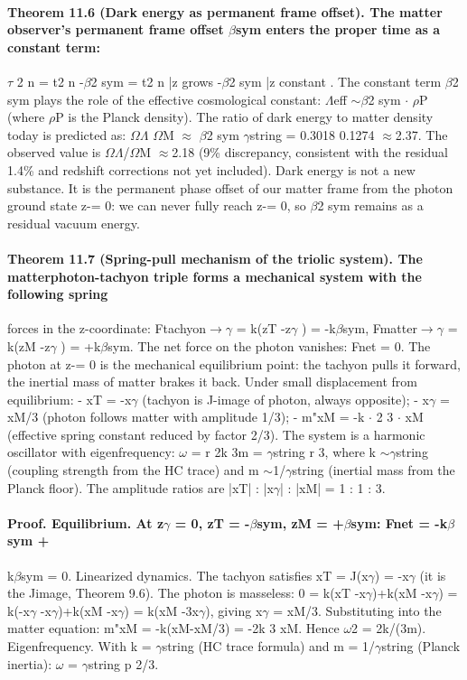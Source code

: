 \documentclass[12pt,a4paper]{article}
\begin{document}
\paragraph*{Theorem 11.6 (Dark energy as permanent frame offset). The matter observer's permanent frame offset $\beta$sym enters the proper time as a constant term:}
$\tau$ 2 n = t2 n -$\beta$2 sym = t2 n |{z} grows -$\beta$2 sym |{z} constant . The constant term $\beta$2 sym plays the role of the effective cosmological constant: $\Lambda$eff $\sim$$\beta$2 sym $\cdot$ $\rho$P (where $\rho$P is the Planck density). The ratio of dark energy to matter density today is predicted as: $\Omega$$\Lambda$ $\Omega$M $\approx$ $\beta$2 sym $\gamma$string = 0.3018
0.1274 $\approx$2.37.
The observed value is $\Omega$$\Lambda$/$\Omega$M $\approx$2.18 (9\% discrepancy, consistent with the residual 1.4\% and redshift corrections not yet included).
Dark energy is not a new substance. It is the permanent phase offset of our matter frame from the photon ground state z-= 0: we can never fully reach z-= 0, so $\beta$2 sym remains as a residual vacuum energy.
\paragraph*{Theorem 11.7 (Spring-pull mechanism of the triolic system). The matterphoton-tachyon triple forms a mechanical system with the following spring}
forces in the z-coordinate: Ftachyon$\to$$\gamma$ = k(zT -z$\gamma$ ) = -k$\beta$sym, Fmatter$\to$$\gamma$ = k(zM -z$\gamma$ ) = +k$\beta$sym. The net force on the photon vanishes: Fnet = 0. The photon at z-= 0 is the mechanical equilibrium point: the tachyon pulls it forward, the inertial mass of matter brakes it back. Under small displacement from equilibrium:
- xT = -x$\gamma$ (tachyon is J-image of photon, always opposite);
- x$\gamma$ = xM/3 (photon follows matter with amplitude 1/3);
- m"xM = -k $\cdot$ 2
3 $\cdot$ xM (effective spring constant reduced by factor 2/3). The system is a harmonic oscillator with eigenfrequency: $\omega$ = r 2k 3m = $\gamma$string r 3, where k $\sim$$\gamma$string (coupling strength from the HC trace) and m $\sim$1/$\gamma$string (inertial mass from the Planck floor). The amplitude ratios are |xT| : |x$\gamma$| : |xM| = 1 : 1 : 3.
\paragraph*{Proof. Equilibrium. At z$\gamma$ = 0, zT = -$\beta$sym, zM = +$\beta$sym: Fnet = -k$\beta$sym +}
k$\beta$sym = 0. Linearized dynamics. The tachyon satisfies xT = J(x$\gamma$) = -x$\gamma$ (it is the Jimage, Theorem 9.6). The photon is masseless: 0 = k(xT -x$\gamma$)+k(xM -x$\gamma$) = k(-x$\gamma$ -x$\gamma$)+k(xM -x$\gamma$) = k(xM -3x$\gamma$), giving x$\gamma$ = xM/3. Substituting into the matter equation: m"xM = -k(xM-xM/3) = -2k 3 xM. Hence $\omega$2 = 2k/(3m). Eigenfrequency. With k = $\gamma$string (HC trace formula) and m = 1/$\gamma$string (Planck inertia): $\omega$ = $\gamma$string p 2/3.
\end{document}
